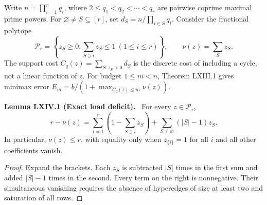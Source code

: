 \documentclass[11pt,a4paper,oneside]{book}
\newcommand{\statement}[3]{\par\medskip\noindent\textbf{#1 #2 (#3).}\ }
\begin{document}
Write $n=\prod_{i=1}^rq_i$, where $2\le q_1<q_2<\cdots<q_r$ are pairwise coprime maximal prime powers. For $\varnothing\ne S\subseteq[r]$, set $d_S=n/\prod_{i\in S}q_i$. Consider the fractional polytope
\[
\mathcal P_r=\left\{z_S\ge0:\sum_{S\ni i}z_S\le1\ (1\le i\le r)\right\},\qquad \nu(z)=\sum_Sz_S.
\]
The support cost $C_q(z)=\sum_{S:z_S>0}d_S$ is the discrete cost of including a cycle, not a linear function of $z$. For budget $1\le m<n$, Theorem LXIII.1 gives minimax error $E_m=b/(1+\max_{C_q(z)\le m}\nu(z))$.

\statement{Lemma}{LXIV.1}{Exact load deficit}
For every $z\in\mathcal P_r$,
\begin{equation}
r-\nu(z)=\sum_{i=1}^r\left(1-\sum_{S\ni i}z_S\right)+\sum_{S\ne\varnothing}(|S|-1)z_S.\tag{413}
\end{equation}
In particular, $\nu(z)\le r$, with equality only when $z_{\{i\}}=1$ for all $i$ and all other coefficients vanish.
\begin{proof}
Expand the brackets. Each $z_S$ is subtracted $|S|$ times in the first sum and added $|S|-1$ times in the second. Every term on the right is nonnegative. Their simultaneous vanishing requires the absence of hyperedges of size at least two and saturation of all rows.
\end{proof}
\end{document}
